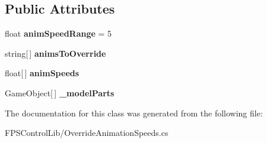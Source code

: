 \subsection*{Public Attributes}
\begin{DoxyCompactItemize}
\item 
\hypertarget{class_f_p_s_control_1_1_override_animation_speeds_a1323c481753755eba334a28077b05002}{float {\bfseries anim\-Speed\-Range} = 5}\label{class_f_p_s_control_1_1_override_animation_speeds_a1323c481753755eba334a28077b05002}

\item 
\hypertarget{class_f_p_s_control_1_1_override_animation_speeds_acb401e78252db195c4e9f5f2e95d8647}{string\mbox{[}$\,$\mbox{]} {\bfseries anims\-To\-Override}}\label{class_f_p_s_control_1_1_override_animation_speeds_acb401e78252db195c4e9f5f2e95d8647}

\item 
\hypertarget{class_f_p_s_control_1_1_override_animation_speeds_ac9d9f895ad236a082a43cbd3954501fd}{float\mbox{[}$\,$\mbox{]} {\bfseries anim\-Speeds}}\label{class_f_p_s_control_1_1_override_animation_speeds_ac9d9f895ad236a082a43cbd3954501fd}

\item 
\hypertarget{class_f_p_s_control_1_1_override_animation_speeds_a1a93005a633f64bec77669851729cc6c}{Game\-Object\mbox{[}$\,$\mbox{]} {\bfseries \-\_\-model\-Parts}}\label{class_f_p_s_control_1_1_override_animation_speeds_a1a93005a633f64bec77669851729cc6c}

\end{DoxyCompactItemize}


The documentation for this class was generated from the following file\-:\begin{DoxyCompactItemize}
\item 
F\-P\-S\-Control\-Lib/Override\-Animation\-Speeds.\-cs\end{DoxyCompactItemize}
